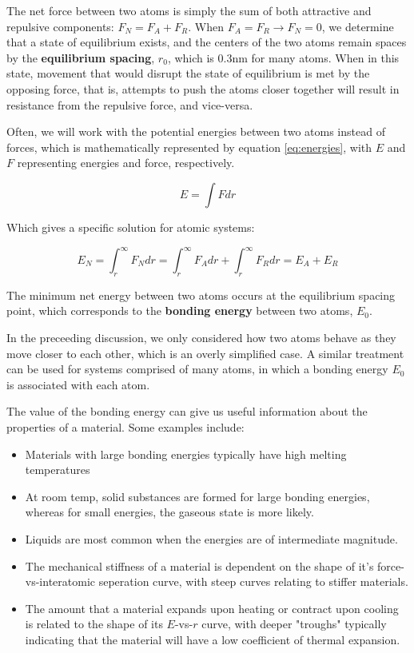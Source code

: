 \documentclass{article}
\begin{document}
The net force between two atoms is simply the sum of both attractive and repulsive components: $F_N = F_A + F_R$. When $F_A = F_R \to F_N = 0$, we determine that a state of equilibrium exists, and the centers of the two atoms remain spaces by the \textbf{equilibrium spacing}, $r_0$, which is $0.3 \text{nm}$ for many atoms. When in this state, movement that would disrupt the state of equilibrium is met by the opposing force, that is, attempts to push the atoms closer together will result in resistance from the repulsive force, and vice-versa.

Often, we will work with the potential energies between two atoms instead of forces, which is mathematically represented by equation \ref{eq:energies}, with $E$ and $F$ representing energies and force, respectively.

\begin{equation}\label{eq:energies}
    E = \int F dr
\end{equation}

Which gives a specific solution for atomic systems:

\begin{equation}
    E_N = \int_r^{\infty} F_N dr = \int_r^{\infty} F_A dr + \int_r^{\infty} F_R dr = E_A + E_R
\end{equation}

The minimum net energy between two atoms occurs at the equilibrium spacing point, which corresponds to the \textbf{bonding energy} between two atoms, $E_0$.

In the preceeding discussion, we only considered how two atoms behave as they move closer to each other, which is an overly simplified case. A similar treatment can be used for systems comprised of many atoms, in which a bonding energy $E_0$ is associated with each atom.

The value of the bonding energy can give us useful information about the properties of a material. Some examples include:

\begin{itemize}
    \item Materials with large bonding energies typically have high melting temperatures
    \item At room temp, solid substances are formed for large bonding energies, whereas for small energies, the gaseous state is more likely.
    \item Liquids are most common when the energies are of intermediate magnitude.
    \item The mechanical stiffness of a material is dependent on the shape of it's force-vs-interatomic seperation curve, with steep curves relating to stiffer materials.
    \item The amount that a material expands upon heating or contract upon cooling is related to the shape of its $E$-vs-$r$ curve, with deeper "troughs" typically indicating that the material will have a low coefficient of thermal expansion.
\end{itemize}
\end{document}
